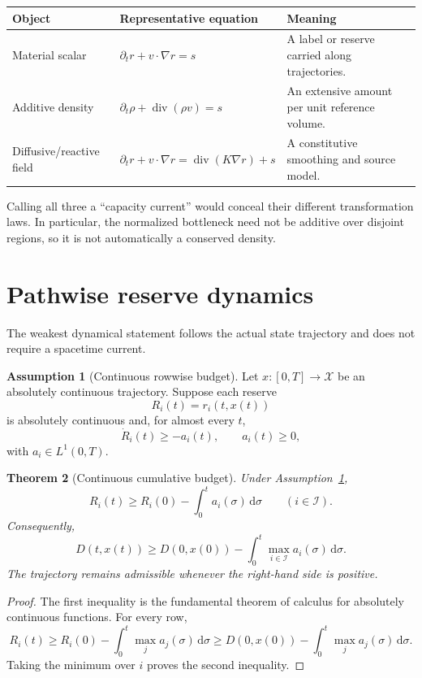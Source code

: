 \documentclass[11pt]{article}
\newtheorem{theorem}{Theorem}[section]
\theoremstyle{definition}
\newtheorem{assumption}[theorem]{Assumption}
\theoremstyle{remark}
\newcommand{\cI}{\mathcal I}
\newcommand{\cX}{\mathcal X}
\newcommand{\dd}{\mathrm d}
\newcommand{\Div}{\operatorname{div}}
\begin{document}
\begin{center}
\begin{tabularx}{\textwidth}{@{}L{0.22\textwidth}Y Y@{}}
\toprule
Object & Representative equation & Meaning \\
\midrule
Material scalar
& \(\partial_t r+v\cdot\nabla r=s\)
& A label or reserve carried along trajectories.\\

Additive density
& \(\partial_t\rho+\Div(\rho v)=s\)
& An extensive amount per unit reference volume.\\

Diffusive/reactive field
& \(\partial_t r+v\cdot\nabla r
   =\Div(K\nabla r)+s\)
& A constitutive smoothing and source model.\\
\bottomrule
\end{tabularx}
\end{center}

Calling all three a ``capacity current'' would conceal their different
transformation laws.  In particular, the normalized bottleneck need not be
additive over disjoint regions, so it is not automatically a conserved
density.

\section{Pathwise reserve dynamics}
\label{sec:pathwise}

The weakest dynamical statement follows the actual state trajectory and
does not require a spacetime current.

\begin{assumption}[Continuous rowwise budget]
\label{ass:path}
Let \(x:[0,T]\to\cX\) be an absolutely continuous trajectory.  Suppose
each reserve
\[
 R_i(t)=r_i(t,x(t))
\]
is absolutely continuous and, for almost every \(t\),
\[
 \dot R_i(t)\ge-a_i(t),
 \qquad
 a_i(t)\ge0,
\]
with \(a_i\in L^1(0,T)\).
\end{assumption}

\begin{theorem}[Continuous cumulative budget]
\label{thm:pathbudget}
Under Assumption~\ref{ass:path},
\[
 R_i(t)
 \ge
 R_i(0)-\int_0^t a_i(\sigma)\,\dd\sigma
 \qquad(i\in\cI).
\]
Consequently,
\[
 D(t,x(t))
 \ge
 D(0,x(0))
 -
 \int_0^t
 \max_{i\in\cI}a_i(\sigma)\,\dd\sigma.
\]
The trajectory remains admissible whenever the right-hand side is
positive.
\end{theorem}

\begin{proof}
The first inequality is the fundamental theorem of calculus for
absolutely continuous functions.  For every row,
\[
 R_i(t)
 \ge
 R_i(0)-\int_0^t\max_j a_j(\sigma)\,\dd\sigma
 \ge
 D(0,x(0))-\int_0^t\max_j a_j(\sigma)\,\dd\sigma.
\]
Taking the minimum over \(i\) proves the second inequality.
\end{proof}
\end{document}
